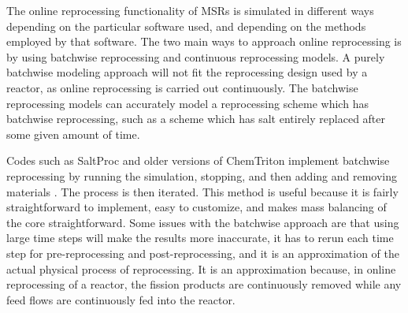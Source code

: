 The online reprocessing functionality of MSRs is simulated in different ways depending on the particular software used, and depending on the methods employed by that software. The two main ways to approach online reprocessing is by using batchwise reprocessing and continuous reprocessing models. %
A purely batchwise modeling approach will not fit the reprocessing design used by a reactor, as online reprocessing is carried out continuously. 
The batchwise reprocessing models can accurately model a reprocessing scheme which has batchwise reprocessing, such as a scheme which has salt entirely replaced after some given amount of time.

Codes such as SaltProc and older versions of ChemTriton implement batchwise reprocessing by running the simulation, stopping, and then adding and removing materials \cite{rykhlevskii_modeling_2019, betzler_molten_2017}. The process is then iterated. This method is useful because it is fairly straightforward to implement, easy to customize, and makes mass balancing of the core straightforward. Some issues with the batchwise approach are that using large time steps will make the results more inaccurate, it has to rerun each time step for pre-reprocessing and post-reprocessing, and it is an approximation of the actual physical process of reprocessing. It is an approximation because, in online reprocessing of a reactor, the fission products are continuously removed while any feed flows are continuously fed into the reactor.

